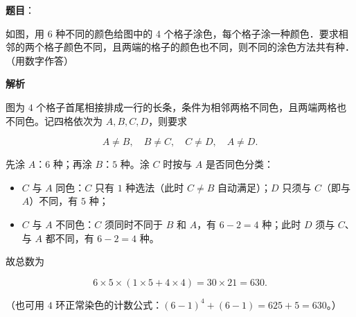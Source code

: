 \begin{answer}

\textbf{题目}：

如图，用 6 种不同的颜色给图中的 4 个格子涂色，每个格子涂一种颜色．要求相邻的两个格子颜色不同，且两端的格子的颜色也不同，则不同的涂色方法共有\gkblank{}种．（用数字作答）
\nopagebreak[4]
\begin{center}\end{center}
\nopagebreak[4]
\textbf{解析}

图为 $4$ 个格子首尾相接排成一行的长条，条件为相邻两格不同色，且两端两格也不同色。记四格依次为 $A,B,C,D$，则要求

\nopagebreak[4]
\[A\ne B,\quad B\ne C,\quad C\ne D,\quad A\ne D .\]

先涂 $A$：$6$ 种；再涂 $B$：$5$ 种。涂 $C$ 时按与 $A$ 是否同色分类：

\begin{itemize}
\item $C$ 与 $A$ 同色：$C$ 只有 $1$ 种选法（此时 $C\ne B$ 自动满足）；$D$ 只须与 $C$（即与 $A$）不同，有 $5$ 种；
\item $C$ 与 $A$ 不同色：$C$ 须同时不同于 $B$ 和 $A$，有 $6-2=4$ 种；此时 $D$ 须与 $C$、与 $A$ 都不同，有 $6-2=4$ 种。
\end{itemize}

故总数为

\nopagebreak[4]
\[6\times5\times\left(1\times5+4\times4\right)=30\times21=630 .\]

（也可用 $4$ 环正常染色的计数公式：$(6-1)^4+(6-1)=625+5=630$。）


\end{answer}
